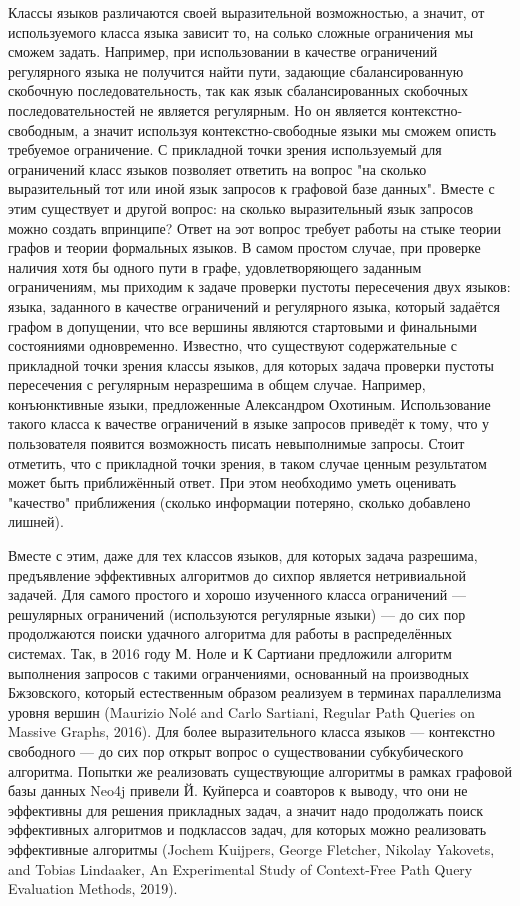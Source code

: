 \documentclass[12pt]{article}  %
\theoremstyle{remark}
\begin{document}
Классы языков различаются своей выразительной возможностью, а значит, от используемого класса языка зависит то, на солько сложные ограничения мы сможем задать.
Например, при использовании в качестве ограничений регулярного языка не получится найти пути, задающие сбалансированную скобочную последовательность, так как язык сбалансированных скобочных последовательностей не является регулярным.
Но он является контекстно-свободным, а значит используя контекстно-свободные языки мы сможем описть требуемое ограничение.
С прикладной точки зрения используемый для ограничений класс языков позволяет ответить на вопрос "на сколько выразительный тот или иной язык запросов к графовой базе данных".
Вместе с этим существует и другой вопрос: на сколько выразительный язык запросов можно создать впринципе?
Ответ на эот вопрос требует работы на стыке теории графов и теории формальных языков.
В самом простом случае, при проверке наличия хотя бы одного пути в графе, удовлетворяющего заданным ограничениям, мы приходим к задаче проверки пустоты пересечения двух языков: языка, заданного в качестве ограничений и регулярного языка, который задаётся графом в допущении, что все вершины являются стартовыми и финальными состояниями одновременно.
Известно, что существуют содержательные с прикладной точки зрения классы языков, для которых задача проверки пустоты пересечения с регулярным неразрешима в общем случае.
Например, конъюнктивные языки, предложенные Александром Охотиным.
Использование такого класса к вачестве ограничений в языке запросов приведёт к тому, что у пользователя появится возможность писать невыполнимые запросы.
Стоит отметить, что с прикладной точки зрения, в таком случае ценным результатом может быть приближённый ответ.
При этом необходимо уметь оценивать "качество" приближения (сколько информации потеряно, сколько добавлено лишней).

Вместе с этим, даже для тех классов языков, для которых задача разрешима, предъявление эффективных алгоритмов до сихпор является нетривиальной задачей.
Для самого простого и хорошо изученного класса ограничений --- решулярных ограничений (используются регулярные языки) --- до сих пор продолжаются поиски удачного алгоритма для работы в распределённых системах.
Так, в 2016 году М. Ноле и К Сартиани предложили алгоритм выполнения запросов с такими огранчениями, основанный на производных Бжзовского, который естественным образом реализуем в терминах параллелизма уровня вершин (Maurizio Nolé and Carlo Sartiani, Regular Path Queries on Massive Graphs, 2016).
Для более выразительного класса языков --- контекстно свободного --- до сих пор открыт вопрос о существовании субкубического алгоритма.
Попытки же реализовать существующие алгоритмы в рамках графовой базы данных  Neo4j привели Й. Куйперса и соавторов к выводу, что они не эффективны для решения прикладных задач, а значит надо продолжать поиск эффективных алгоритмов и подклассов задач, для которых можно реализовать эффективные алгоритмы (Jochem Kuijpers, George Fletcher, Nikolay Yakovets, and Tobias Lindaaker, An Experimental Study of Context-Free Path Query Evaluation Methods,  2019).
\end{document}
